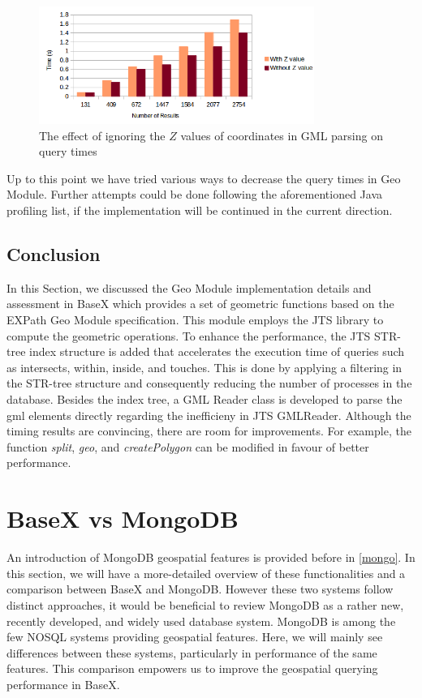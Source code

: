 \documentclass[a4paper,12pt]{article}
\begin{document}
\begin{figure}
\centering
\includegraphics[width=0.8\textwidth,height=0.2\textheight]{BXZvalue-sec}
\caption{The effect of ignoring the $Z$ values of coordinates in GML parsing on query times}
\label{figBXZvalue}
\end{figure}

Up to this point we have tried various ways to decrease the query times in Geo Module. Further attempts could be done following the aforementioned Java profiling list, if the implementation will be continued in the current direction.

\subsection{Conclusion}
\label{BXconc}
In this Section, we discussed the Geo Module implementation details and assessment in BaseX which provides a set of geometric functions based on the EXPath Geo Module specification. This module employs the JTS library to compute the geometric operations. To enhance the performance, the JTS STR-tree index structure is added that accelerates the execution time of queries such as intersects, within, inside, and touches. This is done by applying a filtering in the STR-tree structure and consequently reducing the number of processes in the database. Besides the index tree, a GML Reader class is developed to parse the gml elements directly regarding the inefficieny in JTS GMLReader. Although the timing results are convincing, there are room for improvements. For example, the function \textit{split}, \textit{geo}, and \textit{createPolygon} can be modified in favour of better performance.

\newpage
\section{BaseX vs MongoDB}
\label{s.mongo}

An introduction of MongoDB geospatial features is provided before in \ref{mongo}. In this section, we will have a more-detailed overview of these functionalities and a comparison between BaseX and MongoDB. However these two systems follow distinct approaches, it would be beneficial to review MongoDB as a rather new, recently developed, and widely used database system. MongoDB is among the few NOSQL systems providing geospatial features. Here, we will mainly see differences between these systems, particularly in performance of the same features. This comparison empowers us to improve the geospatial querying performance in BaseX. 
\end{document}
